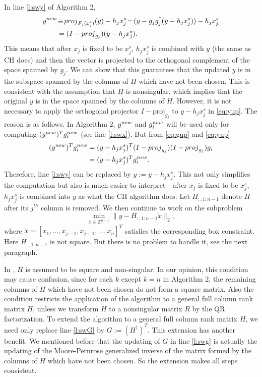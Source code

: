 \documentclass[conference]{IEEEtran}
\newcommand{\be}{\begin{equation}}
\newcommand{\ee}{\end{equation}}
\begin{document}
In line \ref{l:swy} of Algorithm 2,
\begin{align}
y^{\small \mbox{new}} & \!\equiv\! \mbox{proj}_{F_j(x_j^s)}(y) - h_jx_j^s 
 \!=\! (y -  g_jg_j^\dag(y-h_jx_j^s)) - h_jx_j^s  \nonumber \\
   &=  (I-\mbox{proj}_{g_j})(y-h_jx_j^s). \label{eq:yup}  
\end{align}
This means that after $x_j$ is fixed to be $x_j^s$, $h_jx_j^s$ is combined with $y$ (the same
as CH does)  and then the vector is projected to the orthogonal complement of 
the space spanned by $g_j$. 
We can show that this guarantees that the updated $y$ is in the subspace spanned by
the columns of $H$ which have not been chosen.
This is consistent with the assumption that  $H$ is nonsingular, which implies that 
the original $y$  is in the space spanned by  the columns of $H$.
However, it is not necessary to apply the orthogonal projector $I- \mbox{proj}_{g_j}$ to $y-h_jx_j^s$ in \eqref{eq:yup}.
The reason is as follows. 
In Algorithm 2, $y^{\small \mbox{new}}$ and $g_i^{\small \mbox{new}}$ will be used only for computing 
$(y^{\small \mbox{new}})^Tg_i^{\small \mbox{new}}$ (see line \ref{l:swx}).
But from \eqref{eq:gup} and \eqref{eq:yup}
\begin{align*}
(y^{\small \mbox{new}})^Tg_i^{\small \mbox{new}}
& =(y-h_jx_j^s)^T(I-\mbox{proj}_{g_j})(I-\mbox{proj}_{g_j})g_i \\
&=(y-h_jx_j^s)^Tg_i^{\small \mbox{new}}.
\end{align*}
Therefore, line \ref{l:swy} can be replaced by $y:=y-h_jx_j^s$.
This not only simplifies the computation but also is much easier to interpret---after $x_j$ is fixed to be $x_j^s$,  
 $h_jx_j^s$ is combined into $y$ as what the CH algorithm does.
Let $H_{:,1:n-1}$ denote $H$ after its $j^{th}$ column is removed. 
We then continue to work on the subproblem
\be
\min_{\check{x}\in \mathbb{Z}^{n-1}}\|y-H_{:,1:n-1}\check{x}\|_2, 
\label{eq:subs}
\ee
where $\check{x}=[x_1,\ldots,x_{j-1},x_{j+1},\ldots,x_n]^T$ 
satisfies the corresponding box constraint.
Here $H_{:,1:n-1}$ is not square. But there is no problem to handle
it, see the next paragraph.


In \cite{SuW05},  $H$ is assumed to be square and non-singular. 
In our opinion, this condition may cause confusion,
since for each $k$ except $k=n$ in Algorithm 2, 
the remaining columns of $H$ which have not been chosen do not form a square matrix.
Also the condition restricts the application of the algorithm to a general full column rank matrix $H$,
unless we transform $H$ to a nonsingular matrix $R$ by the QR factorization.
To extend the algorithm to a general full column rank matrix $H$, we need only 
replace line \ref{l:swG} by $G:=(H^{\dagger})^T$.
This extension has another benefit. 
We mentioned before that the updating of $G$ in line \ref{l:swg}
is actually the updating of the Moore-Pernrose generalized inverse 
of the matrix formed by the columns of $H$ which have not been chosen. 
So the extension makes all steps consistent.
\end{document}
